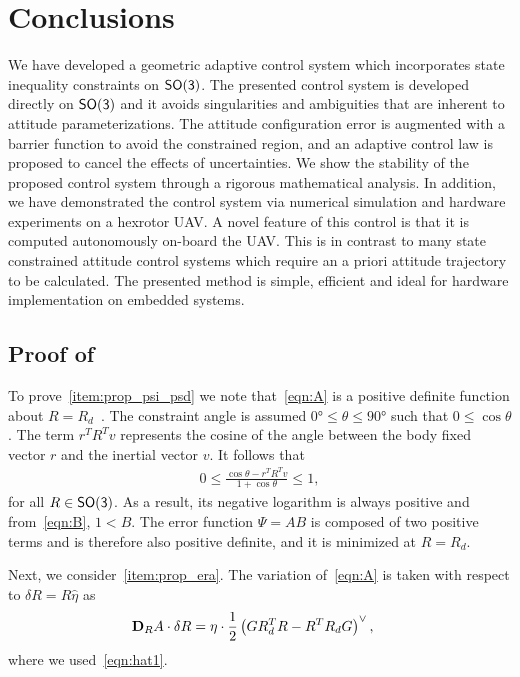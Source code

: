 \documentclass[letterpaper, 10 pt, conference]{ieeeconf}  %
\begin{document}
\section{Conclusions}\label{sec:conclusions}
We have developed a geometric adaptive control system which incorporates state inequality constraints on \(\mathsf{SO(3)}\).
The presented control system is developed directly on \(\mathsf{SO(3)}\) and it avoids singularities and ambiguities that are inherent to attitude parameterizations.
The attitude configuration error is augmented with a barrier function to avoid the constrained region, and an adaptive control law is proposed to cancel the effects of uncertainties. 
We show the stability of the  proposed control system through a rigorous mathematical analysis.
In addition, we have demonstrated the control system via numerical simulation and hardware experiments on a hexrotor UAV.
A novel feature of this control is that it is computed autonomously on-board the UAV.
This is in contrast to many state constrained attitude control systems which require an a priori attitude trajectory to be calculated. 
The presented method is simple, efficient and ideal for hardware implementation on embedded systems.



\appendix
\subsection{Proof of~}\label{proof:config_error}
To prove~\cref{item:prop_psi_psd} we note that~\cref{eqn:A} is a positive definite function about \( R = R_d \)~\cite{bullo2004}.
The constraint angle is assumed \( \ang{0} \leq \theta \leq \ang{90} \) such that \( 0 \leq \cos \theta \).
The term \( r^T R^T v \) represents the cosine of the angle between the body fixed vector \( r \) and the inertial vector \( v \). 
It follows that
\begin{align*}
	0 \leq  \frac{\cos \theta -  r^T R^T v}{1 + \cos \theta} \leq 1 ,
\end{align*}
for all \( R \in \mathsf{SO(3)} \). 
As a result, its negative logarithm is always positive and from~\cref{eqn:B}, \(1 < B\).
The error function \( \Psi = A B \) is composed of two positive terms and is therefore also positive definite, and it is minimized at \( R = R_d \).

Next, we consider~\cref{item:prop_era}.
The variation of~\cref{eqn:A} is taken with respect to \( \delta R = R \hat \eta \) as
\begin{align*}
	\mathbf{D}_{R} A \cdot \delta R &= \eta \cdot \frac{1}{2} \left( G R_d^T R - R^T R_d G\right)^\vee ,
\end{align*}
where we used~\cref{eqn:hat1}.
\end{document}
